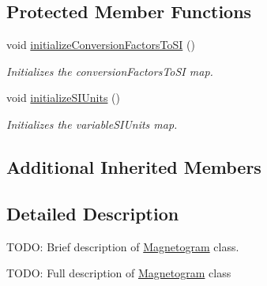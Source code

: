 \subsection*{Protected Member Functions}
\begin{DoxyCompactItemize}
\item 
void \hyperlink{classccmc_1_1_magnetogram_a45db1cbd5d18715de4da31e78590b681}{initialize\-Conversion\-Factors\-To\-S\-I} ()
\begin{DoxyCompactList}\small\item\em Initializes the conversion\-Factors\-To\-S\-I map.  \end{DoxyCompactList}\item 
void \hyperlink{classccmc_1_1_magnetogram_aad6ea4de4693abb550ea316408fb644d}{initialize\-S\-I\-Units} ()
\begin{DoxyCompactList}\small\item\em Initializes the variable\-S\-I\-Units map.  \end{DoxyCompactList}\end{DoxyCompactItemize}
\subsection*{Additional Inherited Members}


\subsection{Detailed Description}
T\-O\-D\-O\-: Brief description of \hyperlink{classccmc_1_1_magnetogram}{Magnetogram} class. 

T\-O\-D\-O\-: Full description of \hyperlink{classccmc_1_1_magnetogram}{Magnetogram} class 

